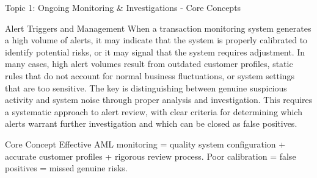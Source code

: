 \documentclass[5pt]{beamer}
\begin{document}
\begin{frame}{Topic 1: Ongoing Monitoring \& Investigations - Core Concepts}
\begin{block}{\tiny Alert Triggers and Management}
			When a transaction monitoring system generates a high volume of alerts, it may indicate that the system is properly calibrated to identify potential risks, or it may signal that the system requires adjustment. In many cases, high alert volumes result from outdated customer profiles, static rules that do not account for normal business fluctuations, or system settings that are too sensitive. The key is distinguishing between genuine suspicious activity and system noise through proper analysis and investigation. This requires a systematic approach to alert review, with clear criteria for determining which alerts warrant further investigation and which can be closed as false positives.
		\end{block}
		
		\begin{alertblock}{Core Concept}
			\tiny Effective AML monitoring = quality system configuration + accurate customer profiles + rigorous review process. Poor calibration = false positives = missed genuine risks.
		\end{alertblock}
	\end{frame}
	
\end{document}
